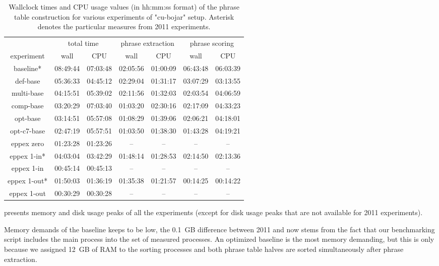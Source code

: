 \begin{table}[ht]
\centering
\begin{tabular}{ | c | c c | c c | c c | }
\hline
 & \multicolumn{2}{|c|}{total time} & \multicolumn{2}{|c|}{phrase extraction} & \multicolumn{2}{|c|}{phrase scoring} \\
experiment & wall & CPU & wall & CPU & wall & CPU \\
\hline
\hline
baseline*     & 08:49:44 & 07:03:48 & 02:05:56 & 01:00:09 & 06:43:48 & 06:03:39 \\
def-base      & 05:36:33 & 04:45:12 & 02:29:04 & 01:31:17 & 03:07:29 & 03:13:55 \\
multi-base    & 04:15:51 & 05:39:02 & 02:11:56 & 01:32:03 & 02:03:54 & 04:06:59 \\
comp-base     & 03:20:29 & 07:03:40 & 01:03:20 & 02:30:16 & 02:17:09 & 04:33:23 \\
opt-base      & 03:14:51 & 05:57:08 & 01:08:29 & 01:39:06 & 02:06:21 & 04:18:01 \\
opt-c7-base   & 02:47:19 & 05:57:51 & 01:03:50 & 01:38:30 & 01:43:28 & 04:19:21 \\
eppex zero    & 01:23:28 & 01:23:26 &       -- &       -- &       -- &       -- \\
\hline
eppex 1-in*   & 04:03:04 & 03:42:29 & 01:48:14 & 01:28:53 & 02:14:50 & 02:13:36 \\
eppex 1-in    & 00:45:14 & 00:45:13 &       -- &       -- &       -- &       -- \\
\hline
eppex 1-out*  & 01:50:03 & 01:36:19 & 01:35:38 & 01:21:57 & 00:14:25 & 00:14:22 \\
eppex 1-out   & 00:30:29 & 00:30:28 &       -- &       -- &       -- &       -- \\
\hline
\end{tabular}
\caption{\label{cu-bojar-time-benchmarks}
Wallclock times and CPU usage values (in hh:mm:ss format) of the phrase table
construction for various experiments of "cu-bojar" setup.
Asterisk denotes the particular measures from 2011 experiments.}
\end{table}

 presents memory and disk usage peaks of all the experiments
(except for disk usage peaks that are not available for 2011 experiments).

Memory demands of the baseline keeps to be low, the 0.1~GB difference between 2011 and now
stems from the fact that our benchmarking script includes the main process into the set of
measured processes.
An optimized baseline is the most memory demanding, but this is only because we assigned 12~GB
of RAM to the sorting processes and both phrase table halves are sorted simultaneously after
phrase extraction.

